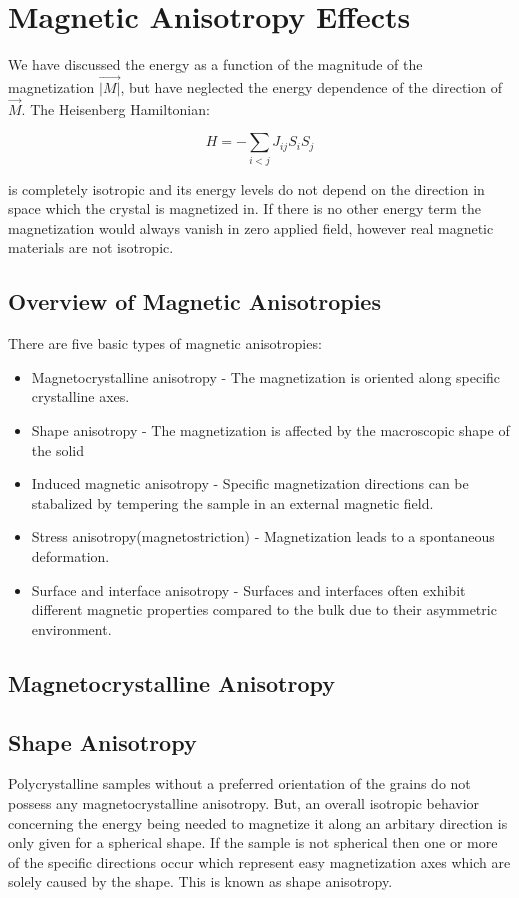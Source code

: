 \documentclass[12pt]{article} %
\begin{document}
\section{Magnetic Anisotropy Effects} %
We have discussed the energy as a function of the magnitude of the magnetization $\vec{|M|}$, but have neglected the energy dependence of the direction of $\vec{M}$. The Heisenberg Hamiltonian:

\begin{equation}
H = - \sum\limits_{i<j} J_{ij}S_iS_j
\end{equation}

is completely isotropic and its energy levels do not depend on the direction in space which the crystal is magnetized in. If there is no other energy term the magnetization would always vanish in zero applied field, however real magnetic materials are not isotropic.

\subsection{Overview of Magnetic Anisotropies} %
There are five basic types of magnetic anisotropies:

\begin{itemize}
\item Magnetocrystalline anisotropy - The magnetization is oriented along specific crystalline axes.
\item Shape anisotropy - The magnetization is affected by the macroscopic shape of the solid
\item Induced magnetic anisotropy - Specific magnetization directions can be stabalized by tempering the sample in an external magnetic field.
\item Stress anisotropy(magnetostriction) - Magnetization leads to a spontaneous deformation.
\item Surface and interface anisotropy - Surfaces and interfaces often exhibit different magnetic properties compared to the bulk due to their asymmetric environment.
\end{itemize}

\subsection{Magnetocrystalline Anisotropy}

\subsection{Shape Anisotropy}
Polycrystalline samples without a preferred orientation of the grains do not possess any magnetocrystalline anisotropy. But, an overall isotropic behavior concerning the energy being needed to magnetize it along an arbitary direction is only given for a spherical shape. If the sample is not spherical then one or more of the specific directions occur which represent easy magnetization axes which are solely caused by the shape. This is known as shape anisotropy.
\end{document}
